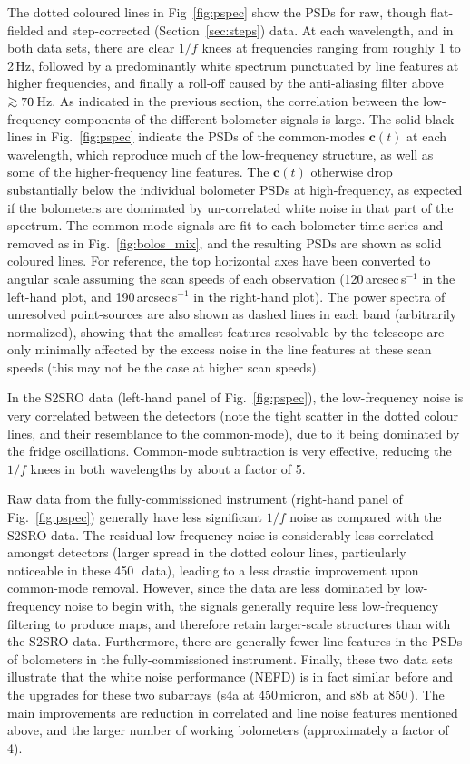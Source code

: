 \documentclass[useAMS,usenatbib,nofootinbib]{mn2e}
\def\gsim{\mathrel{\lower2.5pt\vbox{\lineskip=0pt\baselineskip=0pt
          \hbox{$>$}\hbox{$\sim$}}}}
\begin{document}
The dotted coloured lines in Fig~\ref{fig:pspec} show the PSDs for
raw, though flat-fielded and step-corrected (Section~\ref{sec:steps})
data. At each wavelength, and in both data sets, there are clear $1/f$
knees at frequencies ranging from roughly 1 to 2\,Hz, followed by a
predominantly white spectrum punctuated by line features at higher
frequencies, and finally a roll-off caused by the anti-aliasing filter
above $\gsim 70$\,Hz. As indicated in the previous section, the
correlation between the low-frequency components of the different
bolometer signals is large. The solid black lines in
Fig.~\ref{fig:pspec} indicate the PSDs of the common-modes
$\mathbf{c}(t)$ at each wavelength, which reproduce much of the
low-frequency structure, as well as some of the higher-frequency line
features. The $\mathbf{c}(t)$ otherwise drop substantially below the
individual bolometer PSDs at high-frequency, as expected if the
bolometers are dominated by un-correlated white noise in that part of
the spectrum. The common-mode signals are fit to each bolometer time
series and removed as in Fig.~\ref{fig:bolos_mix}, and the resulting
PSDs are shown as solid coloured lines.  For reference, the top
horizontal axes have been converted to angular scale assuming the scan
speeds of each observation (120\,arcsec\,s$^{-1}$ in the left-hand
plot, and 190\,arcsec\,s$^{-1}$ in the right-hand plot). The power
spectra of unresolved point-sources are also shown as dashed lines in
each band (arbitrarily normalized), showing that the smallest features
resolvable by the telescope are only minimally affected by the excess
noise in the line features at these scan speeds (this may not be the
case at higher scan speeds).

In the S2SRO data (left-hand panel of Fig.~\ref{fig:pspec}), the
low-frequency noise is very correlated between the detectors (note the
tight scatter in the dotted colour lines, and their resemblance to the
common-mode), due to it being dominated by the fridge
oscillations. Common-mode subtraction is very effective, reducing the
$1/f$ knees in both wavelengths by about a factor of 5.

Raw data from the fully-commissioned instrument (right-hand panel of
Fig.~\ref{fig:pspec}) generally have less significant $1/f$ noise as
compared with the S2SRO data. The residual low-frequency noise is
considerably less correlated amongst detectors (larger spread in the
dotted colour lines, particularly noticeable in these 450\,\micron\
data), leading to a less drastic improvement upon common-mode
removal. However, since the data are less dominated by low-frequency
noise to begin with, the signals generally require less low-frequency
filtering to produce maps, and therefore retain larger-scale
structures than with the S2SRO data. Furthermore, there are generally
fewer line features in the PSDs of bolometers in the
fully-commissioned instrument. Finally, these two data sets illustrate
that the white noise performance (NEFD) is in fact similar before and
the upgrades for these two subarrays (s4a at 450\,micron, and s8b at
850\,\micron). The main improvements are reduction in correlated and
line noise features mentioned above, and the larger number of working
bolometers (approximately a factor of 4).
\end{document}
